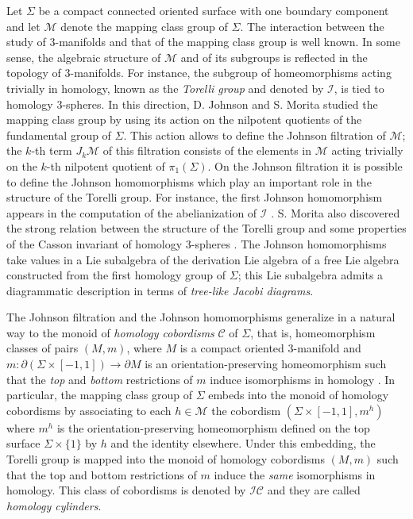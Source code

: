 \documentclass[10pt]{amsart}
\numberwithin{equation}{section}
\numberwithin{equation}{section}
\theoremstyle{definition}
\begin{document}
Let $\Sigma$ be a compact connected  oriented surface  with one boundary component and let $\mathcal{M}$ denote the mapping class group of $\Sigma$.  The interaction between the study of $3$-manifolds and that of the mapping class group is well known. In some sense, the algebraic structure of $\mathcal{M}$ and of its subgroups  is reflected in the topology of $3$-manifolds. For instance, the subgroup of homeomorphisms acting trivially in homology, known as the \emph{Torelli group} and denoted by $\mathcal{I}$, is tied to homology $3$-spheres. In this direction, D. Johnson \cite{MR718141} and S. Morita \cite{MR1224104} studied the  mapping class group by using its action on the nilpotent quotients of the fundamental group of $\Sigma$. This action allows to define the Johnson  filtration of $\mathcal{M}$; the $k$-th term $J_k\mathcal{M}$ of this filtration consists of the elements in $\mathcal{M}$ acting trivially on the $k$-th nilpotent quotient of  $\pi_1(\Sigma)$. On the Johnson filtration it is possible to define  the Johnson homomorphisms which play an important role in the structure of the Torelli group. For instance, the first Johnson homomorphism appears in the computation of the abelianization of $\mathcal{I}$ \cite{MR793179}. S. Morita also  discovered the strong relation between the structure of the Torelli group and some properties of the Casson invariant of homology $3$-spheres \cite{MR1014464,MR1133875,MR1617632}. The Johnson homomorphisms take values in a Lie subalgebra of the derivation Lie algebra of a free Lie algebra constructed from the first homology group of $\Sigma$; this Lie subalgebra admits a diagrammatic description in terms of  \emph{tree-like Jacobi diagrams}. 


The Johnson filtration and the Johnson homomorphisms  generalize in a natural way to the monoid of \emph{homology cobordisms} $\mathcal{C}$ of $\Sigma$, that is, homeomorphism classes of pairs $(M,m)$, where $M$ is a compact oriented $3$-manifold and $m:\partial(\Sigma\times[-1,1])\rightarrow\partial M$ is an orientation-preserving homeomorphism such that the \emph{top} and \emph{bottom} restrictions of $m$ induce  isomorphisms in homology \cite{MR2131016}. In particular, the mapping class group of $\Sigma$  embeds into the monoid of homology cobordisms by associating  to each $h\in\mathcal{M}$ the cobordism $(\Sigma\times\left[-1,1\right], m^h)$ where $m^h$  is the orientation-preserving homeomorphism defined on the top surface $\Sigma\times\{1\}$  by $h$ and the identity elsewhere. Under this embedding,  the Torelli group is mapped into the monoid of homology cobordisms $(M,m)$ such that the top and bottom restrictions of $m$ induce the \emph{same} isomorphisms in homology. This class of cobordisms is denoted by $\mathcal{IC}$ and they are called \emph{homology cylinders}.
\end{document}
